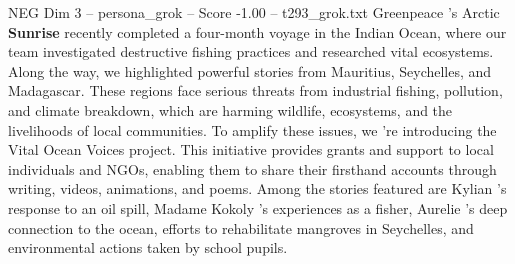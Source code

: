 \begin{textsample}{NEG Dim 3 – persona\_grok – Score -1.00 – t293\_grok.txt}  \label{ex:f3_neg_026}
Greenpeace 's Arctic \textbf{Sunrise} recently completed a four-month voyage in the Indian Ocean, where our team investigated destructive fishing practices and researched vital ecosystems.
Along the way, we highlighted powerful stories from Mauritius, Seychelles, and Madagascar.
These regions face serious threats from industrial fishing, pollution, and climate breakdown, which are harming wildlife, ecosystems, and the livelihoods of local communities.
To amplify these issues, we 're introducing the Vital Ocean Voices project.
This initiative provides grants and support to local individuals and NGOs, enabling them to share their firsthand accounts through writing, videos, animations, and poems.
Among the stories featured are Kylian 's response to an oil spill, Madame Kokoly 's experiences as a fisher, Aurelie 's deep connection to the ocean, efforts to rehabilitate mangroves in Seychelles, and environmental actions taken by school pupils.

\end{textsample}
